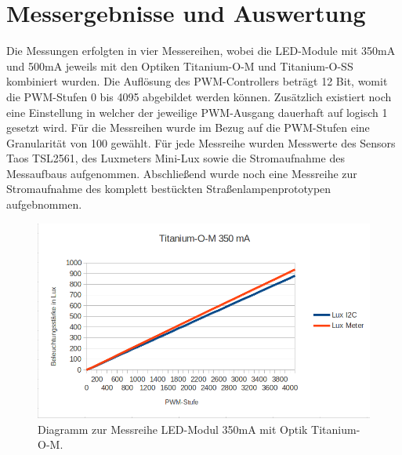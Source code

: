 \documentclass[a4paper,12pt]{scrartcl}
\begin{document}
\clearpage
\section{Messergebnisse und Auswertung}
Die Messungen erfolgten in vier Messereihen, wobei die LED-Module mit 350mA und 500mA jeweils mit den Optiken Titanium-O-M und Titanium-O-SS kombiniert wurden.
Die Auflösung des PWM-Controllers beträgt 12 Bit, womit die PWM-Stufen 0 bis 4095 abgebildet werden können. Zusätzlich existiert noch eine Einstellung in
welcher der jeweilige PWM-Ausgang dauerhaft auf logisch 1 gesetzt wird. Für die Messreihen wurde im Bezug auf die PWM-Stufen eine Granularität von 100 gewählt.
Für jede Messreihe wurden Messwerte  des Sensors Taos TSL2561, des Luxmeters Mini-Lux sowie die Stromaufnahme des Messaufbaus aufgenommen.
Abschließend wurde noch eine Messreihe zur Stromaufnahme des komplett bestückten Straßenlampenprototypen aufgebnommen.


\begin{figure}[H]
  \begin{center}
    \includegraphics[width=1\hsize]{./images/350-m-print.png}
  \end{center}
\caption[Diagramm zur Messreihe LED-Modul 350mA mit Optik Titanium-O-M]{\label{diagram350matitm}Diagramm zur Messreihe LED-Modul 350mA mit Optik
Titanium-O-M.}
\end{figure}
\end{document}
